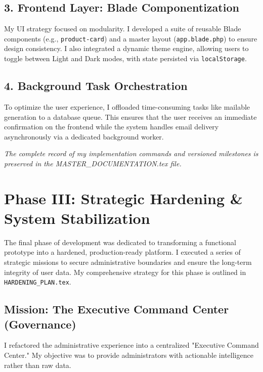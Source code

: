 \documentclass[12pt,a4paper]{article}
\begin{document}
\subsection{3. Frontend Layer: Blade Componentization}
My UI strategy focused on modularity. I developed a suite of reusable Blade components (e.g., \texttt{product-card}) and a master layout (\texttt{app.blade.php}) to ensure design consistency. I also integrated a dynamic theme engine, allowing users to toggle between Light and Dark modes, with state persisted via \texttt{localStorage}.

\subsection{4. Background Task Orchestration}
To optimize the user experience, I offloaded time-consuming tasks like mailable generation to a database queue. This ensures that the user receives an immediate confirmation on the frontend while the system handles email delivery asynchronously via a dedicated background worker.

\vfill
\begin{center}
    \textit{The complete record of my implementation commands and versioned milestones is preserved in the MASTER\_DOCUMENTATION.tex file.}
\end{center}


\newpage
\section{Phase III: Strategic Hardening \& System Stabilization}

The final phase of development was dedicated to transforming a functional prototype into a hardened, production-ready platform. I executed a series of strategic missions to secure administrative boundaries and ensure the long-term integrity of user data. My comprehensive strategy for this phase is outlined in \texttt{HARDENING\_PLAN.tex}.

\subsection{Mission: The Executive Command Center (Governance)}
I refactored the administrative experience into a centralized "Executive Command Center." My objective was to provide administrators with actionable intelligence rather than raw data.
\end{document}
